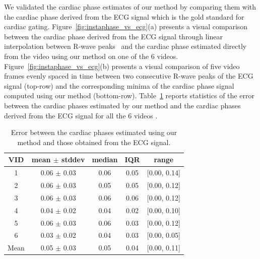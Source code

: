 \documentclass[journal]{IEEEtran}
\newcommand{\rk}[1]{{\color{blue}{#1}}}
\begin{document}
We validated the cardiac phase estimates of our method by comparing them with the cardiac phase derived from the ECG signal which is the gold standard for cardiac gating. Figure~\ref{fig:instaphase_vs_ecg}(a) presents a visual comparison between the cardiac phase derived from the ECG signal through linear interpolation between R-wave peaks~\cite{Rosenblum2001,Freund2003} and the cardiac phase estimated directly from the video using our method on one of the 6 videos. Figure~\ref{fig:instaphase_vs_ecg}(b) presents a visual comparison of five video frames evenly spaced in time between two consecutive R-wave peaks of the ECG signal (top-row) and the corresponding minima of the cardiac phase signal computed using our method (bottom-row). Table~\ref{table:phase_estimation_error} reports statistics of the error between the cardiac phases estimated by our method and the cardiac phases derived from the ECG signal for all the 6 videos \rk{where in the phases are in the normalized $[0, 1]$ range}. 

%
\begin{table}[h]
\begin{minipage}[t]{0.95\linewidth}
\centering
\caption{Error between the cardiac phases estimated using our method and those obtained from the ECG signal.}
\begin{tabular}{|c|c|c|c|c|}
\hline
VID & mean $\pm$ stddev & median & IQR & range \\ \hline
1 & 0.06 $\pm$ 0.03 & 0.06 & 0.05 & {[}0.00, 0.14{]} \\ \hline
2 & 0.06 $\pm$ 0.03 & 0.05 & 0.05 & {[}0.00, 0.12{]} \\ \hline
3 & 0.06 $\pm$ 0.03 & 0.06 & 0.06 & {[}0.00, 0.12{]} \\ \hline
4 & 0.04 $\pm$ 0.02 & 0.04 & 0.02 & {[}0.00, 0.10{]} \\ \hline
5 & 0.06 $\pm$ 0.03 & 0.06 & 0.03 & {[}0.00, 0.12{]} \\ \hline
6 & 0.03 $\pm$ 0.02 & 0.04 & 0.03 & {[}0.00, 0.05{]} \\ \hline \hline
Mean & 0.05 $\pm$ 0.03 & 0.05 & 0.04 & {[}0.00, 0.11{]} \\ \hline
\end{tabular}
\label{table:phase_estimation_error}
\end{minipage}
\end{table}	
%	
	
\end{document}
